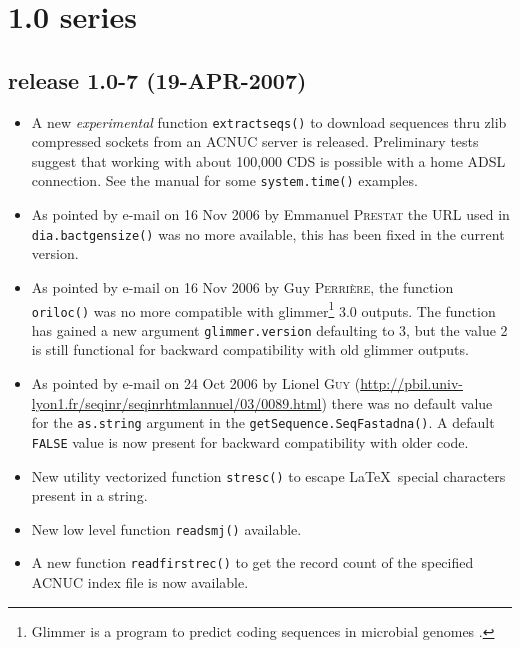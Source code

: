 \documentclass{article}
\begin{document}
\section*{1.0 series}

\subsection*{release 1.0-7 (19-APR-2007)}

\begin{itemize}

\item A new \emph{experimental} function \texttt{extractseqs()} to download
sequences thru zlib compressed sockets from an ACNUC server is released.
Preliminary tests suggest that working with about 100,000 CDS is possible with
a home ADSL connection. See the manual for some \texttt{system.time()}
examples.

\item As pointed by e-mail on 16 Nov 2006 by Emmanuel \textsc{Prestat} the URL
used in \texttt{dia.bactgensize()} was no more available, this has been fixed
in the current version.

\item As pointed by e-mail on 16 Nov 2006 by Guy \textsc{Perri{\`e}re}, the
function \texttt{oriloc()} was no more compatible with glimmer\footnote{
Glimmer is a program to predict coding sequences in microbial genomes \cite{SalzbergSL1998, DelcherAL1999}.
} 3.0
outputs. The function has gained a new argument \texttt{glimmer.version}
defaulting to 3, but the value 2 is still functional for backward compatibility
with old glimmer outputs.

\item As pointed by e-mail on 24 Oct 2006 by Lionel \textsc{Guy}
(\url{http://pbil.univ-lyon1.fr/seqinr/seqinrhtmlannuel/03/0089.html})
there was no default value for the \texttt{as.string} argument in
the \texttt{getSequence.SeqFastadna()}. A default \texttt{FALSE}
value is now present for backward compatibility with older code.

\item New utility vectorized function \texttt{stresc()}  to escape \LaTeX~special
characters present in a string.

\item New low level function \texttt{readsmj()} available.

\item A new function \texttt{readfirstrec()} to get
the record count of the specified ACNUC index file is now available.


\end{itemize}
\end{document}
